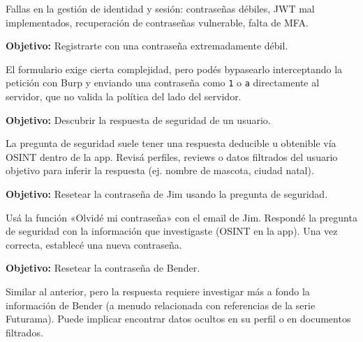 \documentclass[11pt,a4paper]{article}
\begin{document}
\begin{teoria}
Fallas en la gestión de identidad y sesión: contraseñas débiles, JWT mal implementados, recuperación de contraseñas vulnerable, falta de MFA.
\end{teoria}

\begin{desafio}
\textbf{Objetivo:} Registrarte con una contraseña extremadamente débil.
\begin{solucion}
El formulario exige cierta complejidad, pero podés bypasearlo interceptando la petición con Burp y enviando una contraseña como \texttt{1} o \texttt{a} directamente al servidor, que no valida la política del lado del servidor.
\end{solucion}
\end{desafio}

\begin{desafio}
\textbf{Objetivo:} Descubrir la respuesta de seguridad de un usuario.
\begin{solucion}
La pregunta de seguridad suele tener una respuesta deducible u obtenible vía OSINT dentro de la app. Revisá perfiles, reviews o datos filtrados del usuario objetivo para inferir la respuesta (ej. nombre de mascota, ciudad natal).
\end{solucion}
\end{desafio}

\begin{desafio}
\textbf{Objetivo:} Resetear la contraseña de Jim usando la pregunta de seguridad.
\begin{solucion}
Usá la función «Olvidé mi contraseña» con el email de Jim. Respondé la pregunta de seguridad con la información que investigaste (OSINT en la app). Una vez correcta, establecé una nueva contraseña.
\end{solucion}
\end{desafio}

\begin{desafio}
\textbf{Objetivo:} Resetear la contraseña de Bender.
\begin{solucion}
Similar al anterior, pero la respuesta requiere investigar más a fondo la información de Bender (a menudo relacionada con referencias de la serie Futurama). Puede implicar encontrar datos ocultos en su perfil o en documentos filtrados.
\end{solucion}
\end{desafio}
\end{document}
